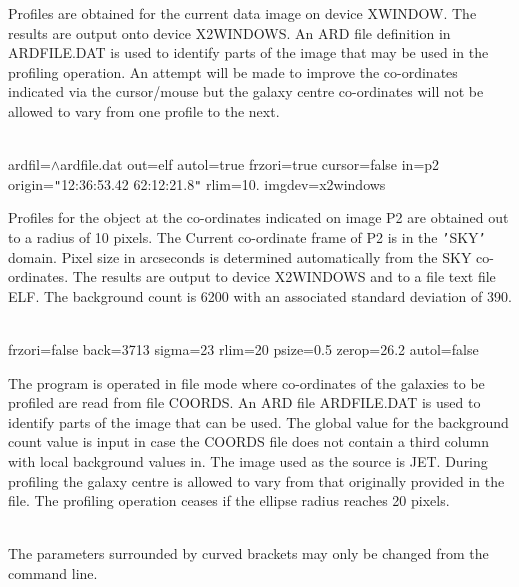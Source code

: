 \documentclass[twoside,11pt]{article}
\newcommand{\LineBreak}{\hfill\break\hbox{}\qquad}
\newlength{\sstexampleslength}
\newcommand{\sstexamplesubsection}[2]{\sloppy
\item[\parbox{\sstexampleslength}{\ssttt #1}] \mbox{} \vspace{1.0ex}
\\ #2 }
\newcommand{\sstnotes}[1]{\item[Notes:] \mbox{} \\[1.3ex] #1}
\newcommand{\sstexamplesubsection}[2]{\item[{\ssttt #1}] #2}
\newcommand{\sstnotes}[1]{\item[Notes:] #1 }
\begin{document}
{{{         Profiles are obtained for the current data image on device
         XWINDOW. The results are output onto device X2WINDOWS. An
         ARD file definition in ARDFILE.DAT is used to identify parts
         of the image that may be used in the profiling operation.
         An attempt will be made to improve the co-ordinates indicated
         via the cursor/mouse but the galaxy centre co-ordinates will
         not be allowed to vary from one profile to the next.
      }
      \sstexamplesubsection{
         ellfou mode=true back=6200 sigma=390. zerop=27.5
      }{
             ardfil=$\wedge$ardfile.dat out=elf autol=true frzori=true
\LineBreak
             cursor=false in=p2 origin={\tt "}12:36:53.42 62:12:21.8{\tt "}
\LineBreak
             rlim=10. imgdev=x2windows

         Profiles for the object at the co-ordinates indicated on image
         P2 are obtained out to a radius of 10 pixels. The Current
         co-ordinate frame of P2 is in the {\tt '}SKY{\tt '} domain.  Pixel size in
         arcseconds is determined automatically from the SKY co-ordinates.
         The results are output to device X2WINDOWS and to a file text
         file ELF. The background count is 6200 with an associated
         standard deviation of 390.
      }
      \sstexamplesubsection{
         ellfou mode=false infile=coords ardfil=$\wedge$ardfile.dat in=jet
      }{
             frzori=false back=3713 sigma=23 rlim=20 psize=0.5
\LineBreak
             zerop=26.2 autol=false

         The program is operated in file mode where co-ordinates
         of the galaxies to be profiled are read from file
         COORDS. An ARD file ARDFILE.DAT is used to identify parts of
         the image that can be used. The global value for the
         background count value is input in case the COORDS file does not
         contain a third column with local background values in.
         The image used as the source is JET. During profiling the
         galaxy centre is allowed to vary from that originally
         provided in the file. The profiling operation ceases
         if the ellipse radius reaches 20 pixels.
      }
   }
   \sstnotes{
      The parameters surrounded by curved brackets may only be changed
      from the command line.
   }
}
\newpage
\end{document}

